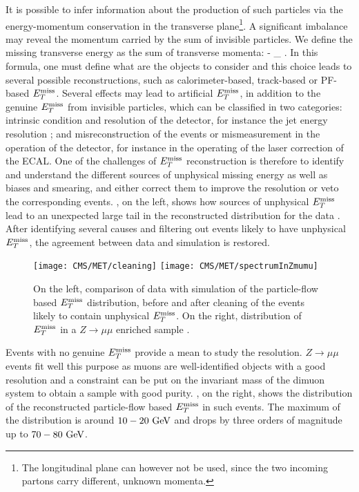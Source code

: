     It is possible to infer information about the production of such particles
    via the energy-momentum conservation in the transverse plane\footnote{The
    longitudinal plane can however not be used, since the two incoming partons
    carry different, unknown momenta.}. A significant imbalance may reveal the
    momentum carried by the sum of invisible particles. We define the missing
    transverse energy as the sum of transverse momenta:
    {
        \vec{\MET}  - \sum_{} \vec{\pT}.
    }
    In this formula, one must define what are the objects to consider and this
    choice leads to several possible reconstructions, such as calorimeter-based,
    track-based or PF-based $E_T^\text{miss}$. Several effects may lead to artificial
    $E_T^\text{miss}$, in addition to the genuine $E_T^\text{miss}$ from invisible particles, which
    can be classified in two categories: intrinsic condition and resolution of
    the detector, for instance the jet energy resolution ; and misreconstruction
    of the events or mismeasurement in the operation of the detector, for
    instance in the operating of the laser correction of the ECAL. One of the
    challenges of $E_T^\text{miss}$ reconstruction is therefore to identify and understand
    the different sources of unphysical missing energy as well as biases and
    smearing, and either correct them to improve the resolution or veto the
    corresponding events.  , on the left, shows how
    sources of unphysical $E_T^\text{miss}$ lead to an unexpected large tail in the
    reconstructed distribution for the data \cite{METperf}.  After identifying
    several causes and filtering out events likely to have unphysical $E_T^\text{miss}$,
    the agreement between data and simulation is restored.

    \begin{figure}[h!]
        \centering
        \texttt{[image: CMS/MET/cleaning]}
        \texttt{[image: CMS/MET/spectrumInZmumu]}
        \caption{On the left, comparison of data with simulation of the
        particle-flow based $E_T^\text{miss}$ distribution, before and after cleaning of
        the events likely to contain unphysical $E_T^\text{miss}$. On the right,
        distribution of $E_T^\text{miss}$ in a $Z \rightarrow \mu\mu$ enriched sample
        \cite{METperf}. }
        \label{fig:METspectrum}
    \end{figure}

    Events with no genuine $E_T^\text{miss}$ provide a mean to study the resolution.  $Z
    \rightarrow \mu\mu$ events fit well this purpose as muons are
    well-identified objects with a good resolution and a constraint can be put
    on the invariant mass of the dimuon system to obtain a sample with good
    purity. , on the right, shows the distribution of
    the reconstructed particle-flow based $E_T^\text{miss}$ in such events. The maximum of
    the distribution is around $10-20~\text{GeV}$ and drops by three orders of
    magnitude up to $70-80~\text{GeV}$.

